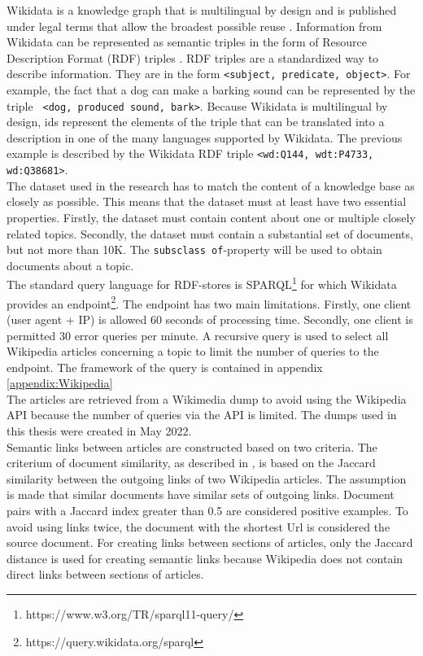 Wikidata is a knowledge graph that is multilingual by design and is published under legal terms that allow the broadest possible reuse \citet{vrandevcic2014wikidata}. Information from Wikidata can be represented as semantic triples in the form of Resource Description Format (RDF) triples \citet{erxleben}. RDF triples are a standardized way to describe information. They are in the form \texttt{<subject, predicate, object>}. For example, the fact that a dog can make a barking sound can be represented by the triple \texttt{ <dog, produced sound, bark>}. Because Wikidata is multilingual by design, ids represent the elements of the triple that can be translated into a description in one of the many languages supported by Wikidata. The previous example is described by the Wikidata RDF triple \texttt{<wd:Q144, wdt:P4733, wd:Q38681>}.\\ 

The dataset used in the research has to match the content of a knowledge base as closely as possible. This means that the dataset must at least have two essential properties. Firstly, the dataset must contain content about one or multiple closely related topics. Secondly, the dataset must contain a substantial set of documents, but not more than 10K. The \texttt{subsclass of}-property will be used to obtain documents about a topic. \\

The standard query language for RDF-stores is SPARQL\footnote{https://www.w3.org/TR/sparql11-query/} for which Wikidata provides an endpoint\footnote{https://query.wikidata.org/sparql}. The endpoint has two main limitations. Firstly, one client (user agent + IP) is allowed 60 seconds of processing time. Secondly, one client is permitted 30 error queries per minute. A recursive query is used to select all Wikipedia articles concerning a topic to limit the number of queries to the endpoint. The framework of the query is contained in appendix \ref{appendix:Wikipedia}\\

The articles are retrieved from a Wikimedia dump to avoid using the Wikipedia API because the number of queries via the API is limited. The dumps used in this thesis were created in May 2022. %
\\

 Semantic links between articles are constructed based on two criteria. The criterium of document similarity, as described in \citet{jiang2019semantic}, is based on the Jaccard similarity \citet{Jaccard1912} between the outgoing links of two Wikipedia articles. The assumption is made that similar documents have similar sets of outgoing links. Document pairs with a Jaccard index greater than 0.5 %
  are considered positive examples. To avoid using links twice, the document with the shortest Url is considered the source document. %
   For creating links between sections of articles, only the Jaccard distance is used for creating semantic links because Wikipedia does not contain direct links between sections of articles.

